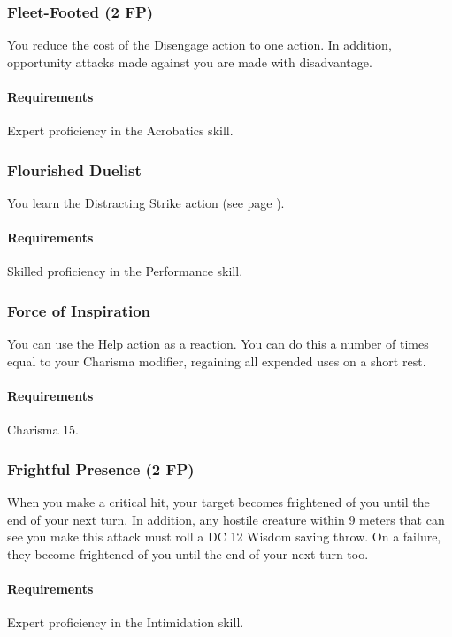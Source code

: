 \subsubsection{Fleet-Footed (2 FP)} \label{feat::fleetfooted}
    You reduce the cost of the Disengage action to one action.
    In addition, opportunity attacks made against you are made with disadvantage.
    \paragraph{Requirements} Expert proficiency in the Acrobatics skill.
\subsubsection{Flourished Duelist} \label{feat::flourishedduelist}
    You learn the Distracting Strike action (see page \pageref{act::distractingstrike}).
    \paragraph{Requirements} Skilled proficiency in the Performance skill.
\subsubsection{Force of Inspiration} \label{feat::forceofinspiration}
    You can use the Help action as a reaction.
    You can do this a number of times equal to your Charisma modifier, regaining all expended uses on a short rest.
    \paragraph{Requirements} Charisma 15.
\subsubsection{Frightful Presence (2 FP)} \label{feat::frightfulpresence}
    When you make a critical hit, your target becomes frightened of you until the end of your next turn.
    In addition, any hostile creature within 9 meters that can see you make this attack must roll a DC 12 Wisdom saving throw.
    On a failure, they become frightened of you until the end of your next turn too.
    \paragraph{Requirements} Expert proficiency in the Intimidation skill.
